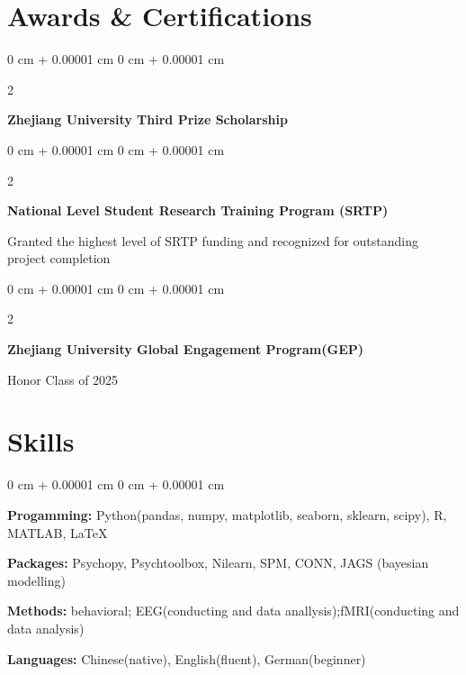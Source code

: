 \documentclass[10pt, letterpaper]{article}
\newenvironment{onecolentry}{
    \begin{adjustwidth}{
        0 cm + 0.00001 cm
    }{
        0 cm + 0.00001 cm
    }
}{
    \end{adjustwidth}
} %
\newenvironment{twocolentry}[2][]{
    \onecolentry
    \def\secondColumn{#2}
    \setcolumnwidth{\fill, 4.5 cm}
    \begin{paracol}{2}
}{
    \switchcolumn \raggedleft \secondColumn
    \end{paracol}
    \endonecolentry
} %
\begin{document}
\section{Awards \& Certifications }

        \vspace{0.2 cm}
        \begin{twocolentry}{
            2024
        }
            \textbf{Zhejiang University Third Prize Scholarship}\end{twocolentry}

        \vspace{0.1 cm}

        \begin{twocolentry}{
            2024
        }
            \textbf{National Level Student Research Training Program (SRTP)}\end{twocolentry}
            Granted the highest level of SRTP funding and recognized for outstanding project completion

        \vspace{0.1 cm}

        \begin{twocolentry}{
            2021
        }
            \textbf{Zhejiang University Global Engagement Program(GEP)}\end{twocolentry}
            Honor Class of 2025
        
\section{Skills}
        
        \begin{onecolentry}
            \item \textbf{Progamming:} Python(pandas, numpy, matplotlib, seaborn, sklearn, scipy), R, MATLAB, LaTeX
            \item \textbf{Packages:} Psychopy, Psychtoolbox, Nilearn, SPM, CONN, JAGS (bayesian modelling)
            \item \textbf{Methods:} behavioral; EEG(conducting and data anallysis);fMRI(conducting and data analysis)
            \item  \textbf{Languages:} Chinese(native), English(fluent), German(beginner)

        \end{onecolentry}
\end{document}
